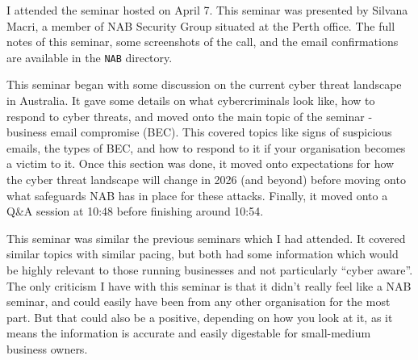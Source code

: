 I attended the seminar hosted on April 7. This seminar was presented by
Silvana Macri, a member of NAB Security Group situated at the Perth
office. The full notes of this seminar, some screenshots of the call,
and the email confirmations are available in the \texttt{NAB} directory.

This seminar began with some discussion on the current cyber threat
landscape in Australia. It gave some details on what cybercriminals look
like, how to respond to cyber threats, and moved onto the main topic of
the seminar - business email compromise (BEC). This covered topics like
signs of suspicious emails, the types of BEC, and how to respond to it
if your organisation becomes a victim to it. Once this section was done,
it moved onto expectations for how the cyber threat landscape will
change in 2026 (and beyond) before moving onto what safeguards NAB has
in place for these attacks. Finally, it moved onto a Q\&A session at
10:48 before finishing around 10:54.

This seminar was similar the previous seminars which I had attended. It
covered similar topics with similar pacing, but both had some
information which would be highly relevant to those running businesses
and not particularly ``cyber aware''. The only criticism I have with
this seminar is that it didn't really feel like a NAB seminar, and could
easily have been from any other organisation for the most part. But that
could also be a positive, depending on how you look at it, as it means
the information is accurate and easily digestable for small-medium
business owners.
